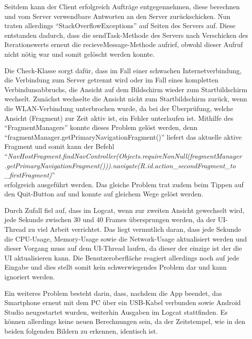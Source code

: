 \documentclass[12pt, onecolumn, notitlepage]{scrartcl}
\begin{document}
Seitdem kann der Client erfolgreich Aufträge entgegennehmen, diese berechnen und vom Server verwendbare Antworten an den Server zurückschicken. Nun traten allerdings \enquote{StackOverflowExceptions} auf Seiten des Servers auf. Diese entstanden dadurch, dass die sendTask-Methode des Servers nach Verschicken des Iterationswerts erneut die recieveMessage-Methode aufrief, obwohl dieser Aufruf nicht nötig war und somit gelöscht werden konnte. \par
Die Check-Klasse sorgt dafür, dass im Fall einer schwachen Internetverbindung, die Verbindung zum Server getrennt wird oder im Fall eines kompletten Verbindunsabbruchs, die Ansicht auf dem Bildschirm wieder zum Startbildschirm wechselt. Zunächst wechselte die Ansicht nicht zum Startbildschirm zurück, wenn die WLAN-Verbindung unterbrochen wurde, da bei der Überprüfung, welche Ansicht (Fragment) zur Zeit aktiv ist, ein Fehler unterlaufen ist. Mithilfe des \enquote{FragmentManagers} konnte dieses Problem gelöst werden, denn \enquote{fragmentManager.getPrimaryNavigationFragment()} liefert das aktuelle aktive Fragment und somit kann der Befehl \\
\enquote{\textit{NavHostFragment.findNavController(Objects.requireNonNull(fragmentManager\\.getPrimaryNavigationFragment())).navigate(R.id.action\_secondFragment\_to\\\_firstFragment)}} \\
erfolgreich ausgeführt werden. Das gleiche Problem trat zudem beim Tippen auf den Quit-Button auf und konnte auf gleichem Wege gelöst werden. \par
Durch Zufall fiel auf, dass im Logcat, wenn zur zweiten Ansicht gewechselt wird, jede Sekunde zwischen 30 und 40 Frames  übersprungen werden, da der UI-Thread zu viel Arbeit verrichtet. Das liegt vermutlich daran, dass jede Sekunde die CPU-Usage, Memory-Usage sowie die Network-Usage aktualisiert werden und dieser Vorgang muss auf dem UI-Thread laufen, da dieser der einzige ist der die UI aktualisieren kann. Die Benutzeroberfläche reagiert allerdings noch auf jede Eingabe und dies stellt somit kein schwerwiegendes Problem dar und kann ignoriert werden. \par
Ein weiteres Problem besteht darin, dass, nachdem die App beendet, das Smartphone erneut mit dem PC über ein USB-Kabel  verbunden sowie Android Studio neugestartet wurden, weiterhin Ausgaben im Logcat stattfinden. Es können allerdings keine neuen Berechnungen sein, da der Zeitstempel, wie in den beiden folgenden Bildern zu erkennen, identisch ist.
\end{document}
